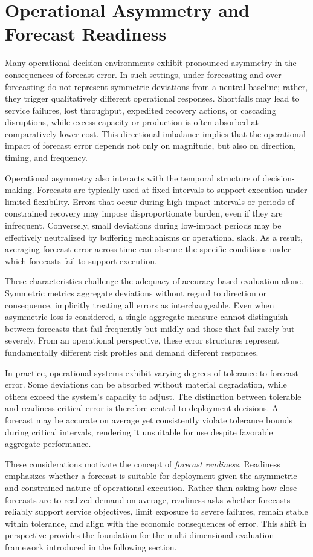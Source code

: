 \section{Operational Asymmetry and Forecast Readiness}

Many operational decision environments exhibit pronounced asymmetry in the consequences of
forecast error. In such settings, under-forecasting and over-forecasting do not represent symmetric
deviations from a neutral baseline; rather, they trigger qualitatively different operational
responses. Shortfalls may lead to service failures, lost throughput, expedited recovery actions,
or cascading disruptions, while excess capacity or production is often absorbed at comparatively
lower cost. This directional imbalance implies that the operational impact of forecast error depends
not only on magnitude, but also on direction, timing, and frequency.

Operational asymmetry also interacts with the temporal structure of decision-making. Forecasts
are typically used at fixed intervals to support execution under limited flexibility. Errors that occur
during high-impact intervals or periods of constrained recovery may impose disproportionate
burden, even if they are infrequent. Conversely, small deviations during low-impact periods may
be effectively neutralized by buffering mechanisms or operational slack. As a result, averaging
forecast error across time can obscure the specific conditions under which forecasts fail to support
execution.

These characteristics challenge the adequacy of accuracy-based evaluation alone. Symmetric
metrics aggregate deviations without regard to direction or consequence, implicitly treating all
errors as interchangeable. Even when asymmetric loss is considered, a single aggregate measure
cannot distinguish between forecasts that fail frequently but mildly and those that fail rarely but
severely. From an operational perspective, these error structures represent fundamentally
different risk profiles and demand different responses.

In practice, operational systems exhibit varying degrees of tolerance to forecast error. Some
deviations can be absorbed without material degradation, while others exceed the system’s
capacity to adjust. The distinction between tolerable and readiness-critical error is therefore central
to deployment decisions. A forecast may be accurate on average yet consistently violate tolerance
bounds during critical intervals, rendering it unsuitable for use despite favorable aggregate
performance.

These considerations motivate the concept of \emph{forecast readiness}. Readiness emphasizes
whether a forecast is suitable for deployment given the asymmetric and constrained nature of
operational execution. Rather than asking how close forecasts are to realized demand on average,
readiness asks whether forecasts reliably support service objectives, limit exposure to severe
failures, remain stable within tolerance, and align with the economic consequences of error. This
shift in perspective provides the foundation for the multi-dimensional evaluation framework
introduced in the following section.
